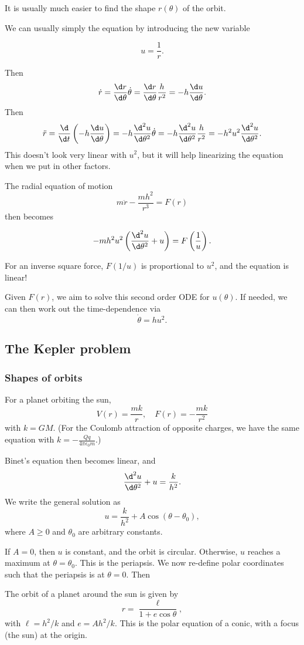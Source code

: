 \documentclass[a4paper]{article}
\begin{document}
It is usually much easier to find the shape $r(\theta)$ of the orbit.

We can usually simply the equation by introducing the new variable
\begin{notation}
  \[
    u = \frac{1}{r}.
  \]
\end{notation}
Then
\[
  \dot{r} = \frac{\d r}{\d \theta}\dot{\theta} = \frac{\d r}{\d \theta}\frac{h}{r^2} = -h\frac{\d u}{\d \theta}.
\]
Then
\[
  \ddot{r} = \frac{\d }{\d t}\left(-h \frac{\d u}{\d \theta}\right) = -h\frac{\d ^2 u}{\d \theta^2}\dot{\theta} = -h\frac{\d ^2u}{\d \theta^2}\frac{h}{r^2} = -h^2u^2\frac{\d^2 u}{\d \theta^2}.
\]
This doesn't look very linear with $u^2$, but it will help linearizing the equation when we put in other factors.

The radial equation of motion 
\[
  m\ddot{r} - \frac{mh^2}{r^3} = F(r)
\]
then becomes
\begin{prop}
  \[
    -mh^2u^2\left(\frac{\d^2u}{\d \theta^2}+ u\right) = F\left(\frac{1}{u}\right).
  \]
\end{prop}
For an inverse square force, $F(1/u)$ is proportional to $u^2$, and the equation is linear!

Given $F(r)$, we aim to solve this second order ODE for $u(\theta)$. If needed, we can then work out the time-dependence via
\[
  \dot{\theta} = hu^2.
\]
\subsection{The Kepler problem}
\subsubsection{Shapes of orbits}
For a planet orbiting the sun,
\[
  V(r) = \frac{mk}{r},\quad F(r) = -\frac{mk}{r^2}
\]
with $k = GM$.
(For the Coulomb attraction of opposite charges, we have the same equation with $\displaystyle k = -\frac{Qq}{4\pi\epsilon_0 m}$.)

Binet's equation then becomes linear, and
\[
  \frac{\d^2 u}{\d \theta^2} + u = \frac{k}{h^2}.
\]
We write the general solution as
\[
  u = \frac{k}{h^2} + A\cos(\theta - \theta_0),
\]
where $A \geq 0$ and $\theta_0$ are arbitrary constants.

If $A = 0$, then $u$ is constant, and the orbit is circular. Otherwise, $u$ reaches a maximum at $\theta = \theta_0$. This is the periapsis. We now re-define polar coordinates such that the periapsis is at $\theta = 0$. Then
\begin{prop}
  The orbit of a planet around the sun is given by
  \[
    r = \frac{\ell}{1 + e\cos \theta},\tag{$*$}
  \]
  with $\ell = h^2/k$ and $e = Ah^2/k$. This is the polar equation of a conic, with a focus (the sun) at the origin.
\end{prop}
\end{document}

